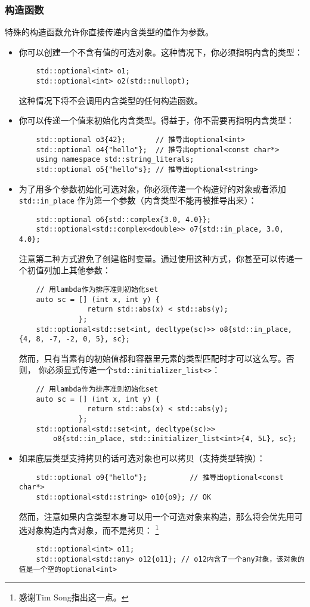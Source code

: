 \subsubsection{构造函数}
特殊的构造函数允许你直接传递内含类型的值作为参数。
\begin{itemize}
    \item 你可以创建一个不含有值的可选对象。这种情况下，你必须指明内含的类型：
    \begin{lstlisting}
    std::optional<int> o1;
    std::optional<int> o2(std::nullopt);
    \end{lstlisting}
    这种情况下将不会调用内含类型的任何构造函数。
    \item 你可以传递一个值来初始化内含类型。得益于，你不需要再指明内含类型：
    \begin{lstlisting}
    std::optional o3{42};       // 推导出optional<int>
    std::optional o4{"hello"};  // 推导出optional<const char*>
    using namespace std::string_literals;
    std::optional o5{"hello"s}; // 推导出optional<string>
    \end{lstlisting}
    \item 为了用多个参数初始化可选对象，你必须传递一个构造好的对象或者添加\texttt{std::in\_place}
    作为第一个参数（内含类型不能再被推导出来）：
    \begin{lstlisting}
    std::optional o6{std::complex{3.0, 4.0}};
    std::optional<std::complex<double>> o7{std::in_place, 3.0, 4.0};
    \end{lstlisting}
    注意第二种方式避免了创建临时变量。通过使用这种方式，你甚至可以传递一个初值列加上其他参数：
    \begin{lstlisting}
    // 用lambda作为排序准则初始化set
    auto sc = [] (int x, int y) {
                return std::abs(x) < std::abs(y);
              };
    std::optional<std::set<int, decltype(sc)>> o8{std::in_place, {4, 8, -7, -2, 0, 5}, sc};
    \end{lstlisting}
    然而，只有当素有的初始值都和容器里元素的类型匹配时才可以这么写。否则，
    你必须显式传递一个\texttt{std::initializer\_list<>}：
    \begin{lstlisting}
    // 用lambda作为排序准则初始化set
    auto sc = [] (int x, int y) {
                return std::abs(x) < std::abs(y);
              };
    std::optional<std::set<int, decltype(sc)>>
        o8{std::in_place, std::initializer_list<int>{4, 5L}, sc};
    \end{lstlisting}
    \item 如果底层类型支持拷贝的话可选对象也可以拷贝（支持类型转换）：
    \begin{lstlisting}
    std::optional o9{"hello"};          // 推导出optional<const char*>
    std::optional<std::string> o10{o9}; // OK
    \end{lstlisting}
    然而，注意如果内含类型本身可以用一个可选对象来构造，那么将会优先用可选对象构造内含对象，而不是拷贝：
    \footnote{感谢Tim Song指出这一点。}
    \begin{lstlisting}
    std::optional<int> o11;
    std::optional<std::any> o12{o11}; // o12内含了一个any对象，该对象的值是一个空的optional<int>
    \end{lstlisting}
\end{itemize}
